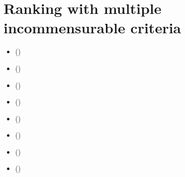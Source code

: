 \documentclass[a4paper,10pt,english]{sphinxhowto}
\begin{document}
\section{Ranking with multiple incommensurable criteria}
\label{\detokenize{tutorial:ranking-with-multiple-incommensurable-criteria}}\label{\detokenize{tutorial:ranking-tutorial-label}}
\begin{sphinxShadowBox}
\begin{itemize}
\item {} 
\label{\detokenize{tutorial:id196}}{\hyperref[\detokenize{tutorial:the-ranking-problem}]{}} ()

\item {} 
\label{\detokenize{tutorial:id197}}{\hyperref[\detokenize{tutorial:the-copeland-ranking}]{}} ()

\item {} 
\label{\detokenize{tutorial:id198}}{\hyperref[\detokenize{tutorial:the-net-flows-ranking}]{}} ()

\item {} 
\label{\detokenize{tutorial:id199}}{\hyperref[\detokenize{tutorial:kemeny-rankings}]{}} ()

\item {} 
\label{\detokenize{tutorial:id200}}{\hyperref[\detokenize{tutorial:slater-rankings}]{}} ()

\item {} 
\label{\detokenize{tutorial:id201}}{\hyperref[\detokenize{tutorial:kohler-s-ranking-by-choosing-rule}]{}} ()

\item {} 
\label{\detokenize{tutorial:id202}}{\hyperref[\detokenize{tutorial:tideman-s-ranked-pairs-rule}]{}} ()

\item {} 
\label{\detokenize{tutorial:id203}}{\hyperref[\detokenize{tutorial:ranking-big-performance-tableaux}]{}} ()

\end{itemize}
\end{sphinxShadowBox}
\end{document}
